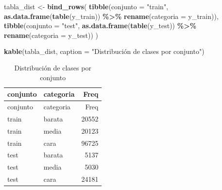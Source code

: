\documentclass[
]{article}
\newenvironment{Shaded}{\begin{snugshade}}{\end{snugshade}}
\newcommand{\AttributeTok}[1]{\textcolor[rgb]{0.13,0.29,0.53}{#1}}
\newcommand{\FunctionTok}[1]{\textcolor[rgb]{0.13,0.29,0.53}{\textbf{#1}}}
\newcommand{\NormalTok}[1]{#1}
\newcommand{\OtherTok}[1]{\textcolor[rgb]{0.56,0.35,0.01}{#1}}
\newcommand{\SpecialCharTok}[1]{\textcolor[rgb]{0.81,0.36,0.00}{\textbf{#1}}}
\newcommand{\StringTok}[1]{\textcolor[rgb]{0.31,0.60,0.02}{#1}}
\begin{document}
\begin{Shaded}
\begin{Highlighting}[]
\NormalTok{tabla\_dist }\OtherTok{\textless{}{-}} \FunctionTok{bind\_rows}\NormalTok{(}
  \FunctionTok{tibble}\NormalTok{(}\AttributeTok{conjunto =} \StringTok{"train"}\NormalTok{, }\FunctionTok{as.data.frame}\NormalTok{(}\FunctionTok{table}\NormalTok{(y\_train)) }\SpecialCharTok{\%\textgreater{}\%} \FunctionTok{rename}\NormalTok{(}\AttributeTok{categoria =}\NormalTok{ y\_train)),}
  \FunctionTok{tibble}\NormalTok{(}\AttributeTok{conjunto =} \StringTok{"test"}\NormalTok{,  }\FunctionTok{as.data.frame}\NormalTok{(}\FunctionTok{table}\NormalTok{(y\_test))  }\SpecialCharTok{\%\textgreater{}\%} \FunctionTok{rename}\NormalTok{(}\AttributeTok{categoria =}\NormalTok{ y\_test))}
\NormalTok{)}

\FunctionTok{kable}\NormalTok{(tabla\_dist, }\AttributeTok{caption =} \StringTok{"Distribución de clases por conjunto"}\NormalTok{)}
\end{Highlighting}
\end{Shaded}

\begin{longtable}[]{@{}llr@{}}
\caption{Distribución de clases por conjunto}\tabularnewline
\toprule\noalign{}
conjunto & categoria & Freq \\
\midrule\noalign{}
\endfirsthead
\toprule\noalign{}
conjunto & categoria & Freq \\
\midrule\noalign{}
\endhead
\bottomrule\noalign{}
\endlastfoot
train & barata & 20552 \\
train & media & 20123 \\
train & cara & 96725 \\
test & barata & 5137 \\
test & media & 5030 \\
test & cara & 24181 \\
\end{longtable}
\end{document}
